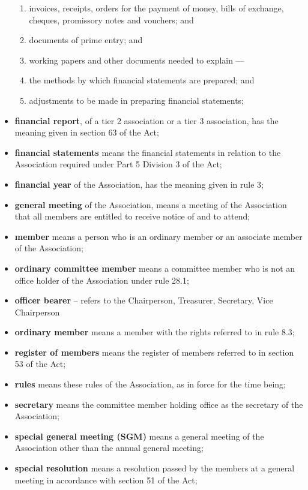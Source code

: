 \documentclass[../constitution.tex]{subfiles}
\begin{document}
\begin{itemize}[label={-}]
\begin{enumerate}
  \item invoices, receipts, orders for the payment of money, bills of exchange, cheques, promissory notes and vouchers; and
  \item documents of prime entry; and
  \item working papers and other documents needed to explain ---
  \item the methods by which financial statements are prepared; and
  \item adjustments to be made in preparing financial statements;
  \end{enumerate}
\item \textbf{financial report}, of a tier 2 association or a tier 3 association, has the meaning given in section 63 of the Act;
\item \textbf{financial statements} means the financial statements in relation to the Association required under Part 5 Division 3 of the Act;
\item \textbf{financial year} of the Association, has the meaning given in rule 3;
\item \textbf{general meeting} of the Association, means a meeting of the Association that all members are entitled to receive notice of and to attend;
\item \textbf{member} means a person who is an ordinary member or an associate member of the Association;
\item \textbf{ordinary committee member} means a committee member who is not an office holder of the Association under rule 28.1;
\item \textbf{officer bearer} -- refers to the Chairperson, Treasurer, Secretary, Vice Chairperson
\item \textbf{ordinary member} means a member with the rights referred to in rule 8.3;
\item \textbf{register of members} means the register of members referred to in section 53 of the Act;
\item \textbf{rules} means these rules of the Association, as in force for the time being;
\item \textbf{secretary} means the committee member holding office as the secretary of the Association;
\item \textbf{special general meeting (SGM)} means a general meeting of the Association other than the annual general meeting;
\item \textbf{special resolution} means a resolution passed by the members at a general meeting in accordance with section 51 of the Act;

\end{itemize}
\end{document}

